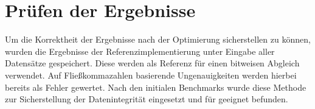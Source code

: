 \section{Prüfen der Ergebnisse}

Um die Korrektheit der Ergebnisse nach der Optimierung sicherstellen zu können, wurden die Ergebnisse der Referenzimplementierung unter Eingabe aller Datensätze gespeichert. Diese werden als Referenz für einen bitweisen Abgleich verwendet. Auf Fließkommazahlen basierende Ungenauigkeiten werden hierbei bereits als Fehler gewertet. Nach den initialen Benchmarks wurde diese Methode zur Sicherstellung der Datenintegrität eingesetzt und für geeignet befunden. 